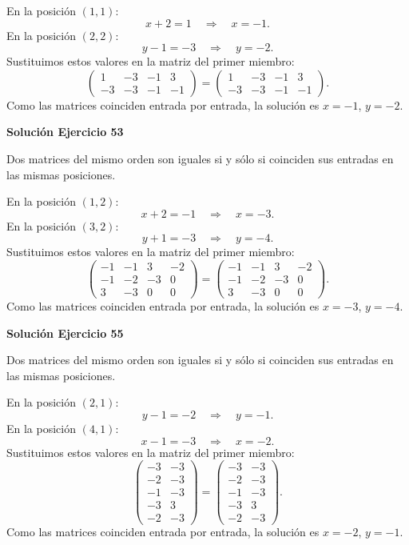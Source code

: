 En la posición $(1,1)$:
\[
x + 2=1\quad\Longrightarrow\quad x=-1.
\]
En la posición $(2,2)$:
\[
y - 1=-3\quad\Longrightarrow\quad y=-2.
\]
Sustituimos estos valores en la matriz del primer miembro:
\[
\begin{pmatrix}1&-3&-1&3\\-3&-3&-1&-1\end{pmatrix}=\begin{pmatrix}1&-3&-1&3\\-3&-3&-1&-1\end{pmatrix}.
\]
Como las matrices coinciden entrada por entrada, la solución es $x=-1$, $y=-2$.


\par\bigskip\noindent\textbf{Solución Ejercicio 53}\par\nobreak
Dos matrices del mismo orden son iguales si y sólo si coinciden sus entradas en las mismas posiciones.

En la posición $(1,2)$:
\[
x + 2=-1\quad\Longrightarrow\quad x=-3.
\]
En la posición $(3,2)$:
\[
y + 1=-3\quad\Longrightarrow\quad y=-4.
\]
Sustituimos estos valores en la matriz del primer miembro:
\[
\begin{pmatrix}-1&-1&3&-2\\-1&-2&-3&0\\3&-3&0&0\end{pmatrix}=\begin{pmatrix}-1&-1&3&-2\\-1&-2&-3&0\\3&-3&0&0\end{pmatrix}.
\]
Como las matrices coinciden entrada por entrada, la solución es $x=-3$, $y=-4$.


\par\bigskip\noindent\textbf{Solución Ejercicio 55}\par\nobreak
Dos matrices del mismo orden son iguales si y sólo si coinciden sus entradas en las mismas posiciones.

En la posición $(2,1)$:
\[
y - 1=-2\quad\Longrightarrow\quad y=-1.
\]
En la posición $(4,1)$:
\[
x - 1=-3\quad\Longrightarrow\quad x=-2.
\]
Sustituimos estos valores en la matriz del primer miembro:
\[
\begin{pmatrix}-3&-3\\-2&-3\\-1&-3\\-3&3\\-2&-3\end{pmatrix}=\begin{pmatrix}-3&-3\\-2&-3\\-1&-3\\-3&3\\-2&-3\end{pmatrix}.
\]
Como las matrices coinciden entrada por entrada, la solución es $x=-2$, $y=-1$.


